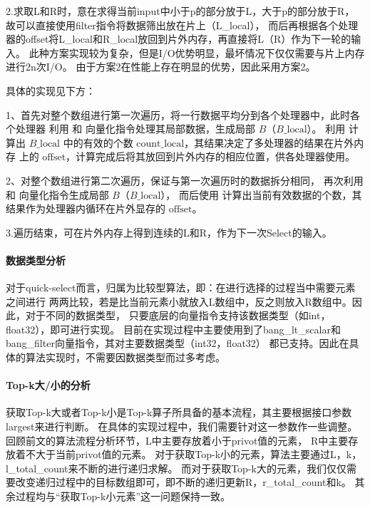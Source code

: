 2.求取L和R时，意在求得当前input中小于p的部分放于L，大于p的部分放于R，
故可以直接使用filter指令将数据筛出放在片上（L\_local），
而后再根据各个处理器的offset将L\_local和R\_local放回到片外内存，再直接将L（R）作为下一轮的输入。
此种方案实现较为复杂，但是I/O优势明显，最坏情况下仅仅需要与片上内存进行2n次I/O。
由于方案2在性能上存在明显的优势，因此采用方案2。

具体的实现见下方：

1、首先对整个数组进行第一次遍历，将一行数据平均分到各个处理器中，此时各个处理器
利用  和  向量化指令处理其局部数据，生成局部 \(B\)（\(B\_\text{local}\)）。
利用  计算出 \(B\_\text{local}\) 中的有效的个数 \(\text{count\_local}\)，其结果决定了多处理器的结果在片外内存
上的 \(\text{offset}\)，计算完成后将其放回到片外内存的相应位置，供各处理器使用。

2、对整个数组进行第二次遍历，保证与第一次遍历时的数据拆分相同，
再次利用  和  向量化指令生成局部 \(B\)（\(B\_\text{local}\)），
而后使用  计算出当前有效数据的个数，其结果作为处理器内循环在片外显存的 \(\text{offset}\)。

3.遍历结束，可在片外内存上得到连续的L和R，作为下一次Select的输入。




\paragraph{数据类型分析}
对于quick-select而言，归属为比较型算法，即：在进行选择的过程当中需要元素之间进行
两两比较，若是比当前元素小就放入L数组中，反之则放入R数组中。因此，对于不同的数据类型，
只要底层的向量指令支持该数据类型（如int，float32），即可进行实现。
目前在实现过程中主要使用到了bang\_lt\_scalar和bang\_filter向量指令，其对主要数据类型（int32，float32）
都已支持。因此在具体的算法实现时，不需要因数据类型而过多考虑。


\paragraph{Top-k大/小的分析}
获取Top-k大或者Top-k小是Top-k算子所具备的基本流程，其主要根据接口参数largest来进行判断。
在具体的实现过程中，我们需要针对这一参数作一些调整。
回顾前文的算法流程分析环节，L中主要存放着小于privot值的元素，
R中主要存放着不大于当前privot值的元素。
对于获取Top-k小的元素，算法主要通过L，k，l\_total\_count来不断的进行递归求解。
而对于获取Top-k大的元素，我们仅仅需要改变递归过程中的目标数组即可，即不断的递归更新R，r\_total\_count和k。
其余过程均与“获取Top-k小元素”这一问题保持一致。



